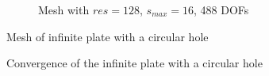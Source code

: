 \begin{figure}[H]\ContinuedFloat
    \begin{subfigure}[b]{1\linewidth}
        \centering
        \caption{Mesh with $res=128$, $s_{max}=16$, 488 DOFs}
    \end{subfigure}
    \caption[Mesh of the infinite plate with a circular hole]{Mesh of infinite plate with a circular hole}
    \label{qdt_fig:ex_chole_mesh_all}
\end{figure}


\begin{figure}[H]
    \centering
    \caption[Convergence of the infinite plate with a circular hole]{Convergence of the infinite plate with a circular hole}
    \label{qdt_fig:ex_chole_mesh_conv}
\end{figure}

